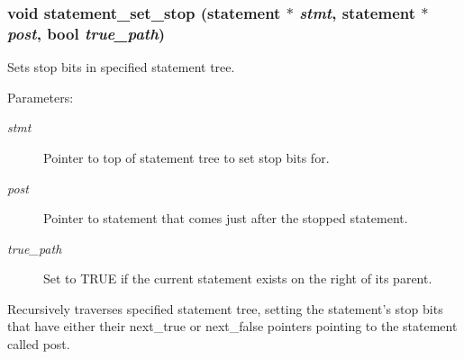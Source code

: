 \subsubsection{\setlength{\rightskip}{0pt plus 5cm}void statement\_\-set\_\-stop ({\bf statement} $\ast$ {\em stmt}, {\bf statement} $\ast$ {\em post}, {\bf bool} {\em true\_\-path})}\label{statement_8h_a4}


Sets stop bits in specified statement tree.

\begin{Desc}
\item[Parameters: ]\par
\begin{description}
\item[{\em 
stmt}]Pointer to top of statement tree to set stop bits for. \item[{\em 
post}]Pointer to statement that comes just after the stopped statement. \item[{\em 
true\_\-path}]Set to TRUE if the current statement exists on the right of its parent.\end{description}
\end{Desc}
Recursively traverses specified statement tree, setting the statement's stop bits that have either their next\_\-true or next\_\-false pointers pointing to the statement called post. 